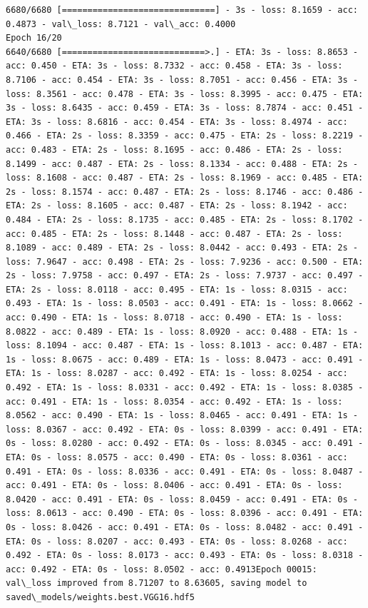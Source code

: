 \documentclass[11pt]{article}
\begin{document}
\begin{Verbatim}[commandchars=\\\{\}]
6680/6680 [==============================] - 3s - loss: 8.1659 - acc: 0.4873 - val\_loss: 8.7121 - val\_acc: 0.4000
Epoch 16/20
6640/6680 [============================>.] - ETA: 3s - loss: 8.8653 - acc: 0.450 - ETA: 3s - loss: 8.7332 - acc: 0.458 - ETA: 3s - loss: 8.7106 - acc: 0.454 - ETA: 3s - loss: 8.7051 - acc: 0.456 - ETA: 3s - loss: 8.3561 - acc: 0.478 - ETA: 3s - loss: 8.3995 - acc: 0.475 - ETA: 3s - loss: 8.6435 - acc: 0.459 - ETA: 3s - loss: 8.7874 - acc: 0.451 - ETA: 3s - loss: 8.6816 - acc: 0.454 - ETA: 3s - loss: 8.4974 - acc: 0.466 - ETA: 2s - loss: 8.3359 - acc: 0.475 - ETA: 2s - loss: 8.2219 - acc: 0.483 - ETA: 2s - loss: 8.1695 - acc: 0.486 - ETA: 2s - loss: 8.1499 - acc: 0.487 - ETA: 2s - loss: 8.1334 - acc: 0.488 - ETA: 2s - loss: 8.1608 - acc: 0.487 - ETA: 2s - loss: 8.1969 - acc: 0.485 - ETA: 2s - loss: 8.1574 - acc: 0.487 - ETA: 2s - loss: 8.1746 - acc: 0.486 - ETA: 2s - loss: 8.1605 - acc: 0.487 - ETA: 2s - loss: 8.1942 - acc: 0.484 - ETA: 2s - loss: 8.1735 - acc: 0.485 - ETA: 2s - loss: 8.1702 - acc: 0.485 - ETA: 2s - loss: 8.1448 - acc: 0.487 - ETA: 2s - loss: 8.1089 - acc: 0.489 - ETA: 2s - loss: 8.0442 - acc: 0.493 - ETA: 2s - loss: 7.9647 - acc: 0.498 - ETA: 2s - loss: 7.9236 - acc: 0.500 - ETA: 2s - loss: 7.9758 - acc: 0.497 - ETA: 2s - loss: 7.9737 - acc: 0.497 - ETA: 2s - loss: 8.0118 - acc: 0.495 - ETA: 1s - loss: 8.0315 - acc: 0.493 - ETA: 1s - loss: 8.0503 - acc: 0.491 - ETA: 1s - loss: 8.0662 - acc: 0.490 - ETA: 1s - loss: 8.0718 - acc: 0.490 - ETA: 1s - loss: 8.0822 - acc: 0.489 - ETA: 1s - loss: 8.0920 - acc: 0.488 - ETA: 1s - loss: 8.1094 - acc: 0.487 - ETA: 1s - loss: 8.1013 - acc: 0.487 - ETA: 1s - loss: 8.0675 - acc: 0.489 - ETA: 1s - loss: 8.0473 - acc: 0.491 - ETA: 1s - loss: 8.0287 - acc: 0.492 - ETA: 1s - loss: 8.0254 - acc: 0.492 - ETA: 1s - loss: 8.0331 - acc: 0.492 - ETA: 1s - loss: 8.0385 - acc: 0.491 - ETA: 1s - loss: 8.0354 - acc: 0.492 - ETA: 1s - loss: 8.0562 - acc: 0.490 - ETA: 1s - loss: 8.0465 - acc: 0.491 - ETA: 1s - loss: 8.0367 - acc: 0.492 - ETA: 0s - loss: 8.0399 - acc: 0.491 - ETA: 0s - loss: 8.0280 - acc: 0.492 - ETA: 0s - loss: 8.0345 - acc: 0.491 - ETA: 0s - loss: 8.0575 - acc: 0.490 - ETA: 0s - loss: 8.0361 - acc: 0.491 - ETA: 0s - loss: 8.0336 - acc: 0.491 - ETA: 0s - loss: 8.0487 - acc: 0.491 - ETA: 0s - loss: 8.0406 - acc: 0.491 - ETA: 0s - loss: 8.0420 - acc: 0.491 - ETA: 0s - loss: 8.0459 - acc: 0.491 - ETA: 0s - loss: 8.0613 - acc: 0.490 - ETA: 0s - loss: 8.0396 - acc: 0.491 - ETA: 0s - loss: 8.0426 - acc: 0.491 - ETA: 0s - loss: 8.0482 - acc: 0.491 - ETA: 0s - loss: 8.0207 - acc: 0.493 - ETA: 0s - loss: 8.0268 - acc: 0.492 - ETA: 0s - loss: 8.0173 - acc: 0.493 - ETA: 0s - loss: 8.0318 - acc: 0.492 - ETA: 0s - loss: 8.0502 - acc: 0.4913Epoch 00015: val\_loss improved from 8.71207 to 8.63605, saving model to saved\_models/weights.best.VGG16.hdf5

\end{Verbatim}
\end{document}
